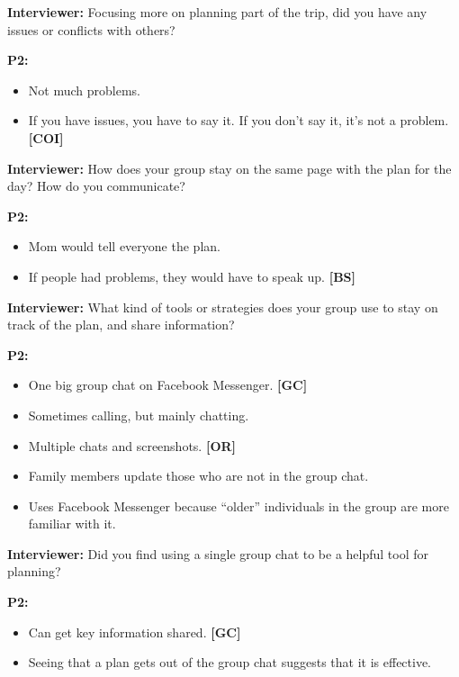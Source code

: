 \documentclass[12pt,a4paper]{article}
\begin{document}
\textbf{Interviewer: }Focusing more on planning part of the trip, did you have any issues or conflicts with others? 

\textbf{P2:}

\begin{itemize}
    \item Not much problems. 
    \item If you have issues, you have to say it. If you don’t say it, it’s not a problem. \textbf{[COI]}
\end{itemize}

\textbf{Interviewer: }How does your group stay on the same page with the plan for the day? How do you communicate?  

\textbf{P2:}

\begin{itemize}
    \item Mom would tell everyone the plan. 
    \item If people had problems, they would have to speak up. \textbf{[BS]}
\end{itemize}

\textbf{Interviewer: }What kind of tools or strategies does your group use to stay on track of the plan, and share information? 

\textbf{P2: }

\begin{itemize}
    \item One big group chat on Facebook Messenger. \textbf{[GC]}
    \item Sometimes calling, but mainly chatting. 
    \item Multiple chats and screenshots. \textbf{[OR]}
    \item Family members update those who are not in the group chat. 
    \item Uses Facebook Messenger because “older” individuals in the group are more familiar with it.  
\end{itemize}

\textbf{Interviewer: }Did you find using a single group chat to be a helpful tool for planning? 

\textbf{P2: }

\begin{itemize}
    \item Can get key information shared. \textbf{[GC]}
    \item Seeing that a plan gets out of the group chat suggests that it is effective.
\end{itemize}
\end{document}

